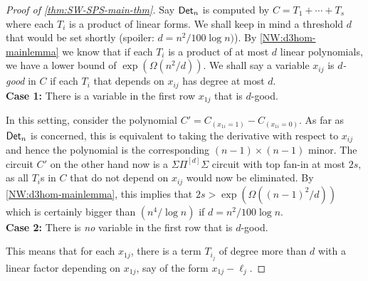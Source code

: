 \begin{proof}[Proof of \autoref{thm:SW-SPS-main-thm}]


Say $\operatorname{\mathsf{Det}}_n$ is computed by $C = T_1 + \cdots + T_s$ where each $T_i$ is a product of linear forms.
We shall keep in mind a threshold $d$ that would be set shortly (spoiler: $d= n^2/100\log n)$).
By \autoref{NW:d3hom-mainlemma} we know that if each $T_i$ is a product of at most $d$ linear polynomials, we have a lower bound of $\exp(\Omega(n^2/d))$. We shall say a variable $x_{ij}$ is \emph{$d$-good} in $C$ if each $T_i$ that depends on $x_{ij}$ has degree at most $d$. \\

{\bf Case 1:} There is a variable in the first row $x_{1j}$ that is $d$-good. 

\medskip

\noindent 
In this setting, consider the polynomial $C' = C_{(x_{1i} = 1)} - C_{(x_{1i} = 0)}$.
As far as $\operatorname{\mathsf{Det}}_n$ is concerned, this is equivalent to taking the derivative with respect to $x_{ij}$ and hence the polynomial is the corresponding $(n-1)\times (n-1)$ minor.
The circuit $C'$ on the other hand now is a $\Sigma\Pi^{[d]}\Sigma$ circuit with top fan-in at most $2s$, as all $T_i$s in $C$ that do not depend on $x_{ij}$ would now be eliminated.
By \autoref{NW:d3hom-mainlemma}, this implies that $2s > \exp(\Omega((n-1)^2/d))$ which is certainly bigger than $(n^4 / \log n)$ if $d = n^2/100\log n$.\\

{\bf Case 2:} There is \emph{no} variable in the first row that is $d$-good. 

\medskip

\noindent 
This means that for each $x_{1j}$, there is a term $T_{i_j}$ of degree more than $d$ with a linear factor depending on $x_{1j}$, say of the form $x_{1j} - \ell_j$. 


\end{proof}





